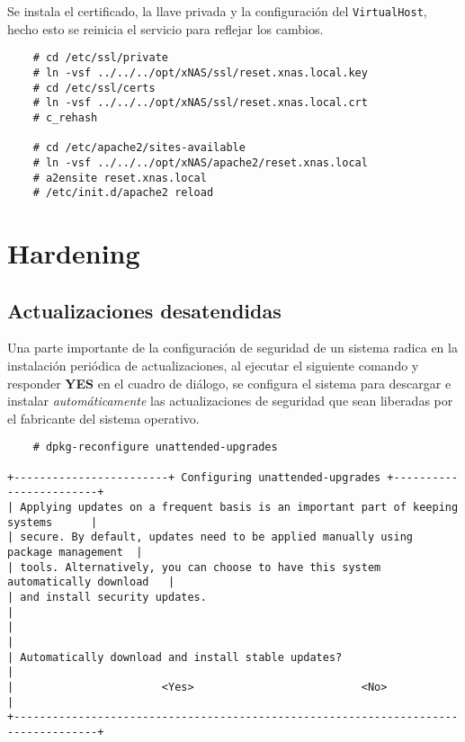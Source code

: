 Se instala el certificado, la llave privada y la configuraci\'{o}n del \texttt{VirtualHost}, hecho esto se reinicia el servicio para reflejar los cambios.

{
\scriptsize
\linespread{1}
\begin{verbatim}
    # cd /etc/ssl/private
    # ln -vsf ../../../opt/xNAS/ssl/reset.xnas.local.key
    # cd /etc/ssl/certs
    # ln -vsf ../../../opt/xNAS/ssl/reset.xnas.local.crt
    # c_rehash

    # cd /etc/apache2/sites-available
    # ln -vsf ../../../opt/xNAS/apache2/reset.xnas.local
    # a2ensite reset.xnas.local
    # /etc/init.d/apache2 reload
\end{verbatim}
}

    \section {Hardening}

      \subsection {Actualizaciones desatendidas}

Una parte importante de la configuraci\'{o}n de seguridad de un sistema radica en la instalaci\'{o}n peri\'{o}dica de actualizaciones, al ejecutar el siguiente comando y responder \textbf{YES} en el cuadro de di\'{a}logo, se configura el sistema para descargar e instalar \emph{autom\'{a}ticamente} las actualizaciones de seguridad que sean liberadas por el fabricante del sistema operativo.

{
\scriptsize
\linespread{1}
\begin{verbatim}
    # dpkg-reconfigure unattended-upgrades

+------------------------+ Configuring unattended-upgrades +------------------------+
| Applying updates on a frequent basis is an important part of keeping systems      |
| secure. By default, updates need to be applied manually using package management  |
| tools. Alternatively, you can choose to have this system automatically download   |
| and install security updates.                                                     |
|                                                                                   |
| Automatically download and install stable updates?                                |
|                       <Yes>                          <No>                         |
+-----------------------------------------------------------------------------------+
\end{verbatim}
}

